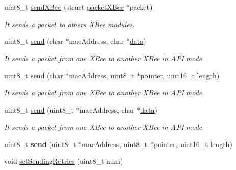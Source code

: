 \begin{DoxyCompactItemize}
uint8\+\_\+t \hyperlink{class_wasp_x_bee_core_a4c45c0ca0cdaa10db84d63c707e495a9}{send\+X\+Bee} (struct \hyperlink{structpacket_x_bee}{packet\+X\+Bee} $\ast$packet)
\begin{DoxyCompactList}\small\item\em It sends a packet to others X\+Bee modules. \end{DoxyCompactList}\item 
uint8\+\_\+t \hyperlink{class_wasp_x_bee_core_a99b75ee89cd9ff80b9ed468ba69f332e}{send} (char $\ast$mac\+Address, char $\ast$\hyperlink{class_wasp_x_bee_core_a81f1c2af5c45fc8e3b63f8f21b3df17f}{data})
\begin{DoxyCompactList}\small\item\em It sends a packet from one X\+Bee to another X\+Bee in A\+PI mode. \end{DoxyCompactList}\item 
uint8\+\_\+t \hyperlink{class_wasp_x_bee_core_a9091051d44ed9ff8884f949c92c3e89f}{send} (char $\ast$mac\+Address, uint8\+\_\+t $\ast$pointer, uint16\+\_\+t length)
\begin{DoxyCompactList}\small\item\em It sends a packet from one X\+Bee to another X\+Bee in A\+PI mode. \end{DoxyCompactList}\item 
uint8\+\_\+t \hyperlink{class_wasp_x_bee_core_a2769cff2bbd72cf9e7e9d030913e73e7}{send} (uint8\+\_\+t $\ast$mac\+Address, char $\ast$\hyperlink{class_wasp_x_bee_core_a81f1c2af5c45fc8e3b63f8f21b3df17f}{data})\hypertarget{class_wasp_x_bee_core_a2769cff2bbd72cf9e7e9d030913e73e7}{}\label{class_wasp_x_bee_core_a2769cff2bbd72cf9e7e9d030913e73e7}

\begin{DoxyCompactList}\small\item\em It sends a packet from one X\+Bee to another X\+Bee in A\+PI mode. \end{DoxyCompactList}\item 
uint8\+\_\+t {\bfseries send} (uint8\+\_\+t $\ast$mac\+Address, uint8\+\_\+t $\ast$pointer, uint16\+\_\+t length)\hypertarget{class_wasp_x_bee_core_ab539fa7442fa3196ba237e8933d800c8}{}\label{class_wasp_x_bee_core_ab539fa7442fa3196ba237e8933d800c8}

\item 
void \hyperlink{class_wasp_x_bee_core_ad7071c2b88ee349791c1d8dfbc09b478}{set\+Sending\+Retries} (uint8\+\_\+t num)\hypertarget{class_wasp_x_bee_core_ad7071c2b88ee349791c1d8dfbc09b478}{}\label{class_wasp_x_bee_core_ad7071c2b88ee349791c1d8dfbc09b478}


\end{DoxyCompactItemize}
